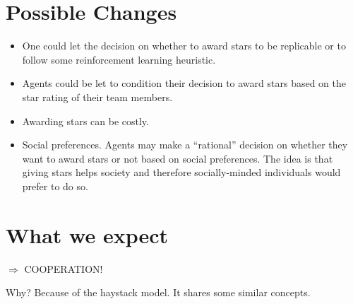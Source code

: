 \documentclass[12pt,a4paper]{article}
\begin{document}
\section{Possible Changes}
\begin{itemize}
	\item One could let the decision on whether to award stars to be replicable or to follow some reinforcement learning heuristic.
	\item Agents could be let to condition their decision to award stars based on the star rating of their team members.
	\item Awarding stars can be costly.
	\item Social preferences. Agents may make a ``rational'' decision on whether they want to award stars or not based on social preferences. The idea is that giving stars helps society and therefore socially-minded individuals would prefer to do so.
\end{itemize}

\section{What we expect}
$\Rightarrow$ COOPERATION! 

Why? Because of the haystack model. It shares some similar concepts. 
\end{document}
